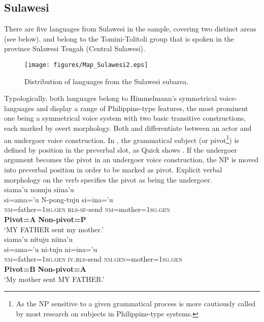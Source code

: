 \subsection{Sulawesi}

There are five languages from Sulawesi in the sample, covering two distinct areas (see  below).  and  belong to the Tomini-Tolitoli group that is spoken in the province Sulawesi Tengah (Central Sulawesi). 

\begin{figure}
\texttt{[image: figures/Map\_Sulawesi2.eps]}
\caption{Distribution of languages from the Sulawesi subarea.}\label{map:Sul}

\end{figure}

Typologically, both languages belong to Himmelmann's symmetrical voice-languages and display a range of Philippine-type features, the most prominent one being a symmetrical voice system with two basic transitive constructions, each marked by overt morphology. Both  and  differentiate between an actor and an undergoer voice construction. In , the grammatical subject (or pivot\footnote{As the NP sensitive to a given grammatical process is more cautiously called by most research on subjects in Philippine-type systems.}) is defined by position in the preverbal slot, as Quick shows \citep[124]{Quick2007}. If the undergoer argument becomes the pivot in an undergoer voice construction, the NP is moved into preverbal position in order to be marked as pivot. Explicit verbal morphology on the verb specifies the pivot as being the undergoer.
\largerpage[1]
\ea 
{}\\
\ea \label{Pendau_ex1}
\gllll siama'u nonuju siina'u \\
si=ama='u N-pong-tuju si=ina='u \\
 \textsc{nm}=father=\textsc{1}\textsc{sg}.\textsc{gen} \textsc{rls}-\textsc{sf}-send \textsc{nm}=mother=\textsc{1}\textsc{sg}.\textsc{gen} \\
 \textbf{Pivot=A} {} \textbf{Non-pivot=P} \\
\glft `MY FATHER sent my mother.' \\ 
\ex \label{Pendau_ex2}
\gllll siama'u nituju niina'u \\
si=ama='u ni-tuju ni=ina='u \\
 \textsc{nm}=father=\textsc{1}\textsc{sg}.\textsc{gen} \textsc{iv}.\textsc{rls}-send \textsc{nm}.\textsc{gen}=mother=\textsc{1}\textsc{sg}.\textsc{gen} \\
 \textbf{Pivot=B} {} \textbf{Non-pivot=A} \\
\glft `My mother sent MY FATHER.'\\ 
\z
\z

